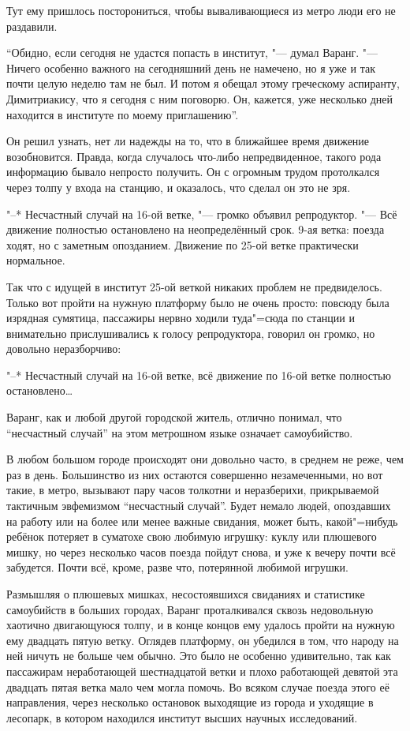 Тут ему пришлось посторониться, чтобы вываливающиеся из метро люди его не
раздавили.

\enquote{Обидно, если сегодня не удастся попасть в институт, "--- думал Варанг.
"--- Ничего особенно важного на сегодняшний день не намечено, но я уже и так
почти целую неделю там не был.
И потом я обещал этому греческому аспиранту, Димитриакису, что я сегодня с ним
поговорю.
Он, кажется, уже несколько дней находится в институте по моему приглашению}.

Он решил узнать, нет ли надежды на то, что в ближайшее время движение
возобновится.
Правда, когда случалось что-либо непредвиденное, такого рода информацию бывало
непросто получить.
Он с огромным трудом протолкался через толпу у входа на станцию, и оказалось,
что сделал он это не зря.

"--* Несчастный случай на 16-ой ветке, "--- громко объявил репродуктор.
"--- Всё движение полностью остановлено на неопределённый срок.
9-ая ветка: поезда ходят, но с заметным опозданием.
Движение по 25-ой ветке практически нормальное.

Так что с идущей в институт 25-ой веткой никаких проблем не предвиделось.
Только вот пройти на нужную платформу было не очень просто: повсюду была
изрядная сумятица, пассажиры нервно ходили туда"=сюда по станции и внимательно
прислушивались к голосу репродуктора, говорил он громко, но довольно
неразборчиво:

"--* Несчастный случай на 16-ой ветке, всё движение по 16-ой ветке полностью
остановлено\ldots

Варанг, как и любой другой городской житель, отлично понимал, что
\enquote{несчастный случай} на этом метрошном языке означает самоубийство.

В любом большом городе происходят они довольно часто, в среднем не реже, чем раз
в день.
Большинство из них остаются совершенно незамеченными, но вот такие, в метро,
вызывают пару часов толкотни и неразберихи, прикрываемой тактичным эвфемизмом
\enquote{несчастный случай}.
Будет немало людей, опоздавших на работу или на более или менее важные свидания,
может быть, какой"=нибудь ребёнок потеряет в суматохе свою любимую игрушку:
куклу или плюшевого мишку, но через несколько часов поезда пойдут снова, и уже к
вечеру почти всё забудется.
Почти всё, кроме, разве что, потерянной любимой игрушки.

Размышляя о плюшевых мишках, несостоявшихся свиданиях и статистике самоубийств в
больших городах, Варанг проталкивался сквозь недовольную хаотично двигающуюся
толпу, и в конце концов ему удалось пройти на нужную ему двадцать пятую ветку.
Оглядев платформу, он убедился в том, что народу на ней ничуть не больше чем
обычно.
Это было не особенно удивительно, так как пассажирам неработающей шестнадцатой
ветки и плохо работающей девятой эта двадцать пятая ветка мало чем могла помочь.
Во всяком случае поезда этого её направления, через несколько остановок
выходящие из города и уходящие в лесопарк, в котором находился институт высших
научных исследований.

